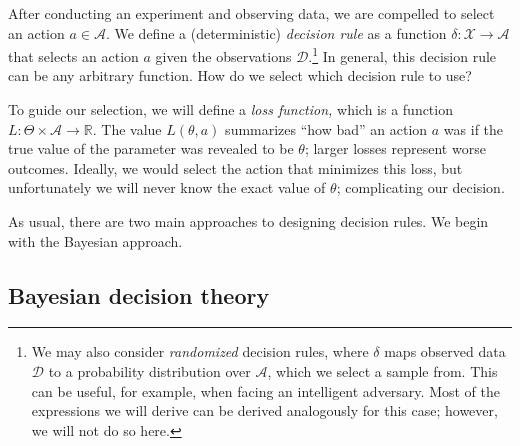 \documentclass{article}
\newcommand{\mc}[1]{\mathcal{#1}}
\newcommand{\data}{\mc{D}}
\newcommand{\R}{\mathbb{R}}
\begin{document}
After conducting an experiment and observing data, we are compelled to
select an action $a \in \mc{A}$.  We define a (deterministic)
\emph{decision rule} as a function $\delta\colon \mc{X} \to \mc{A}$
that selects an action $a$ given the observations $\data$.\footnote{We
  may also consider \emph{randomized} decision rules, where $\delta$
  maps observed data $\data$ to a probability distribution over
  $\mc{A}$, which we select a sample from.  This can be useful, for
  example, when facing an intelligent adversary.  Most of the
  expressions we will derive can be derived analogously for this case;
  however, we will not do so here.}  In general, this decision rule
can be any arbitrary function.  How do we select which decision rule
to use?

To guide our selection, we will define a \emph{loss function,} which
is a function $L\colon \Theta \times \mc{A} \to \R$.  The value
$L(\theta, a)$ summarizes ``how bad'' an action $a$ was if the true
value of the parameter was revealed to be $\theta$; larger losses
represent worse outcomes.  Ideally, we would select the action that
minimizes this loss, but unfortunately we will never know the exact
value of $\theta$; complicating our decision.

As usual, there are two main approaches to designing decision rules.
We begin with the Bayesian approach.

\subsection*{Bayesian decision theory}
\end{document}
